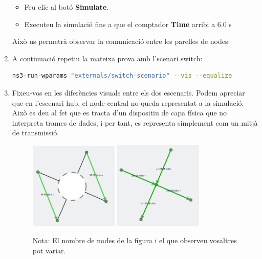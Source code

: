 \documentclass[12pt,a4paper]{article}
\begin{document}
\begin{enumerate}
\begin{itemize}
 \item Feu clic al botó \textbf{Simulate}.
 \item Executeu la simulació fins a que el comptador \textbf{Time} arribi a 6.0 s
\end{itemize}

Això us permetrà observar la comunicació entre les parelles de nodes.

\item A continuació repetiu la mateixa prova amb l'scenari switch:
\begin{lstlisting}[language=bash,basicstyle=\footnotesize]
ns3-run-wparams "externals/switch-scenario" --vis --equalize
\end{lstlisting}

\item Fixeu-vos en les diferències visuals entre els dos escenaris. Podem apreciar que en l'escenari hub, el node central no queda representat a la simulació. Això es deu al fet que es tracta d'un dispositiu de capa física que no interpreta trames de dades, i per tant, es representa simplement com un mitjà de transmissió.
\begin{figure}[!ht]
  \begin{center}
    \includegraphics[width=0.4\textwidth]{hub-coms}
    \includegraphics[width=0.4\textwidth]{switch-coms}    
    \label{ns3}
  \end{center}
  \begin{center}
   Nota: El nombre de nodes de la figura i el que observeu vosaltres pot variar.
  \end{center}


\end{figure}
\end{enumerate}
\end{document}
